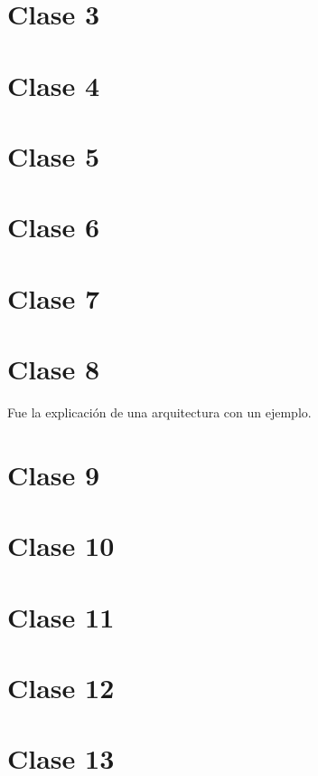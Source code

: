 \documentclass[titlepage,a4paper]{article}
\begin{document}
\section*{Clase 3}

\newpage

\section*{Clase 4}

\newpage

\section*{Clase 5}

\newpage

\section*{Clase 6}

\newpage

\section*{Clase 7}

\newpage

\section*{Clase 8}
Fue la explicación de una arquitectura con un ejemplo.

\section*{Clase 9}

\newpage

\section*{Clase 10}

\newpage

\section*{Clase 11}

\newpage

\section*{Clase 12}


\section*{Clase 13}

\newpage
\end{document}
